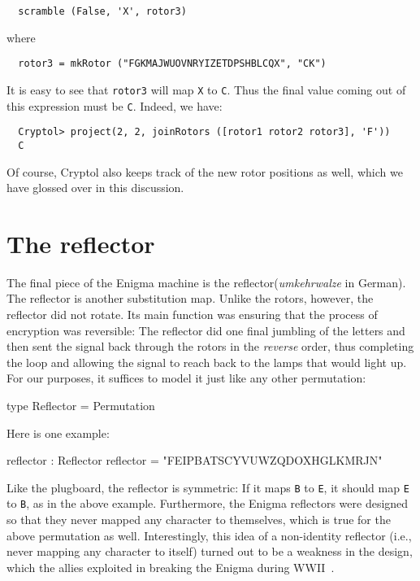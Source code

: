 \begin{Answer}
\begin{Verbatim}
  scramble (False, 'X', rotor3)
\end{Verbatim}
where
\begin{Verbatim}
  rotor3 = mkRotor ("FGKMAJWUOVNRYIZETDPSHBLCQX", "CK")
\end{Verbatim}
It is easy to see that {\tt rotor3} will map {\tt X} to {\tt C}. Thus
the final value coming out of this expression must be {\tt C}. Indeed,
we have:\indTupleProj
\begin{Verbatim}
  Cryptol> project(2, 2, joinRotors ([rotor1 rotor2 rotor3], 'F'))
  C
\end{Verbatim}
Of course, Cryptol also keeps track of the new rotor positions as
well, which we have glossed over in this discussion.
\end{Answer}

\section{The reflector}
\label{sec:enigma:reflector}

The final piece of the Enigma machine is the
reflector\indEnigmaReflector ({\em umkehrwalze} in German). The
reflector is another substitution map. Unlike the rotors, however, the
reflector did not rotate.  Its main function was ensuring that the
process of encryption was reversible: The reflector did one final
jumbling of the letters and then sent the signal back through the
rotors in the {\em reverse} order, thus completing the loop and
allowing the signal to reach back to the lamps that would light up.
For our purposes, it suffices to model it just like any other
permutation:
\begin{code}
  type Reflector = Permutation
\end{code}
Here is one example:
\begin{code}
  reflector : Reflector
  reflector = "FEIPBATSCYVUWZQDOXHGLKMRJN"
\end{code}
Like the plugboard, the reflector is symmetric: If it maps {\tt B} to
{\tt E}, it should map {\tt E} to {\tt B}, as in the above
example. Furthermore, the Enigma reflectors were designed so that they
never mapped any character to themselves, which is true for the above
permutation as well. Interestingly, this idea of a non-identity
reflector (i.e., never mapping any character to itself) turned out to
be a weakness in the design, which the allies exploited in breaking
the Enigma during WWII~\cite{Singh:1999:CBE}.


